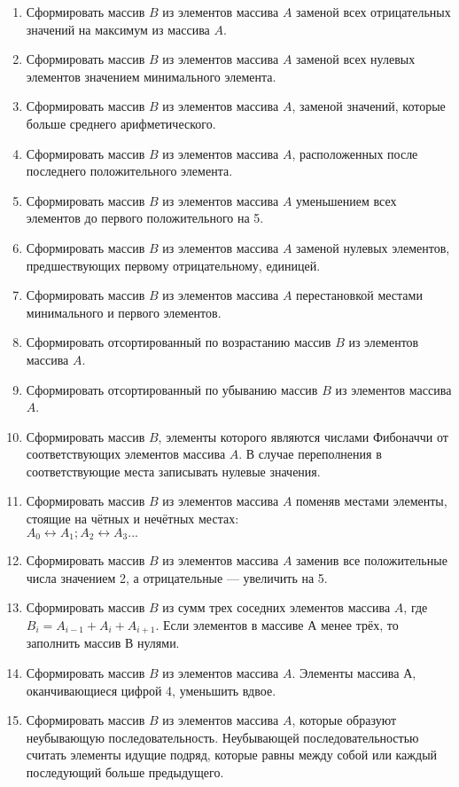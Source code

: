 \documentclass[a4paper, 12pt, oneside]{article}
\begin{document}
\begin{enumerate}
    \item Сформировать массив $B$ из элементов массива $A$ заменой всех отрицательных значений на максимум из массива $A$.
    \item Сформировать массив $B$ из элементов массива $A$ заменой всех нулевых элементов значением минимального элемента.
    \item Сформировать массив $B$ из элементов массива $A$, заменой значений, которые больше среднего арифметического.
    \item Сформировать массив $B$ из элементов массива $A$, расположенных после последнего положительного элемента.
    \item Сформировать массив $B$ из элементов массива $A$ уменьшением всех элементов до первого положительного на 5.
    \item Сформировать массив $B$ из элементов массива $A$ заменой нулевых элементов, предшествующих первому отрицательному, единицей.
    \item Сформировать массив $B$ из элементов массива $A$ перестановкой местами минимального и первого элементов.
    \item Сформировать отсортированный по возрастанию массив $B$ из элементов массива $A$.
    \item Сформировать отсортированный по убыванию массив $B$ из элементов массива $A$.
    \item Сформировать массив $B$, элементы которого являются  числами Фибоначчи от соответствующих элементов массива $A$. В случае переполнения в соответствующие места записывать нулевые значения.
    \item Сформировать массив $B$ из элементов массива $A$ поменяв местами элементы, стоящие на чётных и нечётных местах: \\ $A_0 \leftrightarrow A_1; A_2 \leftrightarrow A_3 ... $
    \item Сформировать массив $B$ из элементов массива $A$ заменив все положительные числа значением 2, а отрицательные — увеличить на 5.
    \item Сформировать массив $B$ из сумм трех соседних элементов массива $A$, где $B_i = A_{i-1}+A_{i}+A_{i+1}$. Если элементов в массиве А менее трёх, то заполнить массив В нулями.
    \item Сформировать массив $B$ из элементов массива $A$. Элементы массива $А$, оканчивающиеся цифрой 4, уменьшить вдвое.
    \item Сформировать массив $B$ из элементов массива $A$, которые образуют неубывающую последовательность. Неубывающей последовательностью считать элементы идущие подряд, которые равны между собой или каждый последующий больше предыдущего.

\end{enumerate}
\end{document}
